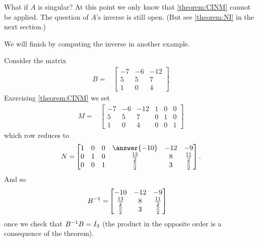 \documentclass{ximera}
\begin{document}
What if $A$ is singular?  At this point we only know that
\ref{theorem:CINM} cannot be applied.  The question of $A$'s inverse
is still open.  (But see \ref{theorem:NI} in the next section.)

We will finish by computing the inverse in another example.

\begin{example}
  Consider the matrix
  \begin{align*}
    B=&\begin{bmatrix}
      -7&-6&-12\\
      5&5&7\\
      1&0&4
    \end{bmatrix}
  \end{align*}
  Exercising \ref{theorem:CINM} we set
  \begin{align*}
    M=&
        \begin{bmatrix}
          -7&-6&-12&1&0&0\\
          5&5&7&0&1&0\\
          1&0&4&0&0&1
        \end{bmatrix}
  \end{align*}
  which row reduces to
  \begin{align*}
    N=&
        \begin{bmatrix}
          1&0&0&\answer{-10} & -12 & -9\\
          0&1&0&\frac{13}{2} & 8 & \frac{11}{2}\\
          0&0&1&\frac{5}{2} & 3 & \frac{5}{2}
        \end{bmatrix}.\\
  \end{align*}
  And so
  \begin{align*}
    B^{-1}=&
                  \begin{bmatrix}
                    -10 & -12 & -9\\
                    \frac{13}{2} & 8 & \frac{11}{2}\\
                    \frac{5}{2} & 3 & \frac{5}{2}
                  \end{bmatrix}
  \end{align*}
  once we check that $B^{-1}B=I_3$ (the product in the opposite order is a consequence of the theorem).
\end{example}
\end{document}
